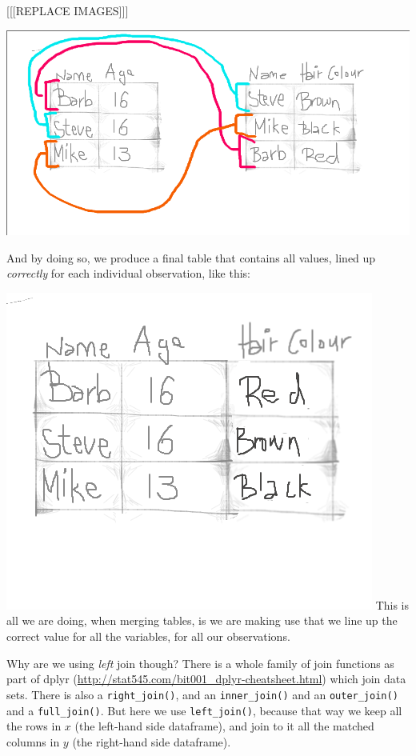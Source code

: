 \documentclass[
]{book}
\begin{document}
{[}{[}{[}REPLACE IMAGES{]}{]}{]}

\includegraphics{img/merge_logic_1.png}

And by doing so, we produce a final table that contains all values, lined up \emph{correctly} for each individual observation, like this:

\includegraphics{img/merge_logic_2.png}
This is all we are doing, when merging tables, is we are making use that we line up the correct value for all the variables, for all our observations.

Why are we using \emph{left} join though? There is a whole family of join functions as part of dplyr (\url{http://stat545.com/bit001_dplyr-cheatsheet.html}) which join data sets. There is also a \texttt{right\_join()}, and an \texttt{inner\_join()} and an \texttt{outer\_join()} and a \texttt{full\_join()}. But here we use \texttt{left\_join()}, because that way we keep all the rows in \(x\) (the left-hand side dataframe), and join to it all the matched columns in \(y\) (the right-hand side dataframe).
\end{document}
